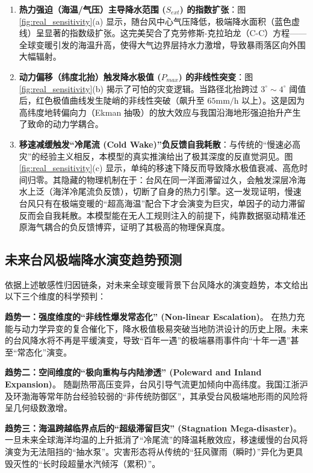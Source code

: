 \documentclass[12pt,a4paper]{ctexart}
\begin{document}
\begin{enumerate}
    \item \textbf{热力强迫（海温/气压）主导降水范围 ($S_{ext}$) 的指数扩张}：图 \ref{fig:real_sensitivity}(a) 显示，随台风中心气压降低，极端降水面积（蓝色虚线）呈显著的指数级扩张。这完美契合了克劳修斯-克拉珀龙（C-C）方程——全球变暖引发的海温升高，使得大气边界层持水力激增，导致暴雨落区向外围大幅辐射。
    
    \item \textbf{动力偏移（纬度北抬）触发降水极值 ($P_{max}$) 的非线性突变}：图 \ref{fig:real_sensitivity}(b) 揭示了可怕的灾变逻辑。当路径北抬跨过 $3^\circ \sim 4^\circ$ 阈值后，红色极值曲线发生陡峭的非线性突破（飙升至 $65\text{mm/h}$ 以上）。这是因为高纬度地转偏向力（Ekman 抽吸）的放大效应与我国沿海地形强迫抬升产生了致命的动力学耦合。
    
    \item \textbf{移速减缓触发“冷尾流 (Cold Wake)”负反馈自我耗散}：与传统的“慢速必高灾”的经验主义相反，本模型的真实推演给出了极其深度的反直觉洞见。图 \ref{fig:real_sensitivity}(c) 显示，单纯的移速下降反而导致降水极值衰减、高危时间归零。其隐藏的物理机制在于：台风在同一洋面滞留过久，会触发深层冷海水上泛（海洋冷尾流负反馈），切断了自身的热力引擎。这一发现证明，慢速台风只有在极端变暖的“超高海温”配合下才会演变为巨灾，单因子的动力滞留反而会自我耗散。本模型能在无人工规则注入的前提下，纯靠数据驱动精准还原海气耦合的负反馈博弈，证明了其极高的物理保真度。
\end{enumerate}

\subsection{未来台风极端降水演变趋势预测}
依据上述敏感性归因链条，对未来全球变暖背景下台风降水的演变趋势，本文给出以下三个维度的科学预判：

\textbf{趋势一：强度维度的“非线性爆发常态化” (Non-linear Escalation)}。
在热力充能与动力学异变的复合催化下，降水极值极易突破当地防洪设计的历史上限。未来的台风降水将不再是平缓演变，导致“百年一遇”的极端暴雨事件向“十年一遇”甚至“常态化”演变。

\textbf{趋势二：空间维度的“极向重构与内陆渗透” (Poleward and Inland Expansion)}。
随副热带高压变异，台风引导气流更加倾向中高纬度。我国江浙沪及环渤海等常年防台经验较弱的“非传统防御区”，其承受台风极端地形雨的风险将呈几何级数激增。

\textbf{趋势三：海温跨越临界点后的“超级滞留巨灾” (Stagnation Mega-disaster)}。
一旦未来全球海洋均温的上升抵消了“冷尾流”的降温耗散效应，移速缓慢的台风将演变为无法阻挡的“抽水泵”。灾害形态将从传统的“狂风骤雨（瞬时）”异化为更具毁灭性的“长时段超量水汽倾泻（累积）”。
\end{document}
